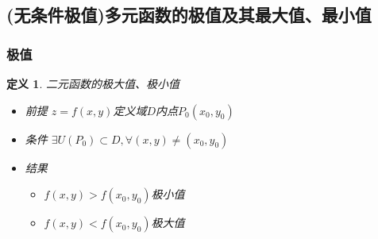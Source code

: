 \documentclass[UTF8,a4paper,12pt,scheme=chinese]{ctexbook}
\theoremstyle{plain}
\newtheorem{definition}{定义}[section]
\begin{document}
	\subsection{(无条件极值)多元函数的极值及其最大值、最小值}
	\subsubsection{极值}
	\begin{definition}
		二元函数的极大值、极小值
		\begin{itemize}
			\item 前提 $z=f(x,y)$定义域$D$内点$ P_0(x_0,y_0) $
			\item 条件 $ \exists U(P_0)\subset D ,\forall(x,y)\neq(x_0,y_0)$
			\item 结果
			\begin{itemize}
				\item $ f(x,y)>f(x_0,y_0) $\quad 极小值
				\item $ f(x,y)<f(x_0,y_0) $\quad 极大值
			\end{itemize}
		\end{itemize}
	\end{definition}
\end{document}
